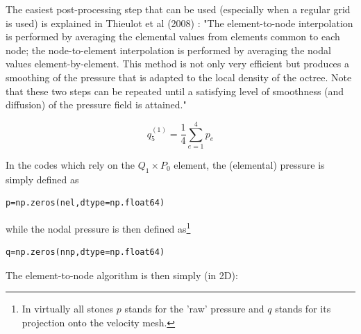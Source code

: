 The easiest post-processing step that can be used (especially when a regular grid is used) 
is explained in Thieulot et al (2008) \cite{thfb08}: "The element-to-node interpolation is performed by
averaging the elemental values from elements common to each node; 
the node-to-element interpolation is performed
by averaging the nodal values element-by-element. This
method is not only very efficient but produces a smoothing
of the pressure that is adapted to the local density of the
octree. Note that these two steps can be repeated until a
satisfying level of smoothness (and diffusion) of the pressure field is attained."


\begin{center}
\end{center}
\[
q_5^{(1)} = \frac{1}{4}\sum_{e=1}^4 p_e
\] 

In the codes which rely on the $Q_1 \times P_0$ element, the (elemental) pressure
is simply defined as 
\begin{lstlisting}
p=np.zeros(nel,dtype=np.float64)  
\end{lstlisting}
while the nodal pressure is then defined as\footnote{In virtually all stones $p$
stands for the 'raw' pressure and $q$ stands for its projection onto the velocity mesh.} 
\begin{lstlisting}
q=np.zeros(nnp,dtype=np.float64)  
\end{lstlisting}
The element-to-node algorithm is then simply (in 2D):

